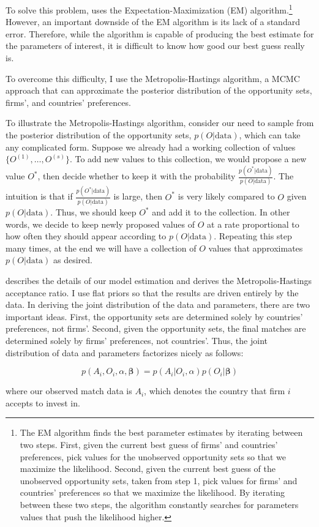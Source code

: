 To solve this problem, \cite{Logan1996} uses the Expectation-Maximization (EM) algorithm.\footnote{The EM algorithm finds the best parameter estimates by iterating between two steps. First, given the current best guess of firms' and countries' preferences, pick values for the unobserved opportunity sets so that we maximize the likelihood. Second, given the current best guess of the unobserved opportunity sets, taken from step 1, pick values for firms' and countries' preferences so that we maximize the likelihood. By iterating between these two steps, the algorithm constantly searches for parameters values that push the likelihood higher.} However, an important downside of the EM algorithm is its lack of a standard error. Therefore, while the algorithm is capable of producing the best estimate for the parameters of interest, it is difficult to know how good our best guess really is.

To overcome this difficulty, I use the Metropolis-Hastings algorithm, a MCMC approach that can approximate the posterior distribution of the opportunity sets, firms', and countries' preferences.

To illustrate the Metropolis-Hastings algorithm, consider our need to sample from the posterior distribution of the opportunity sets, $p(O|\text{data})$, which can take any complicated form. Suppose we already had a working collection of values $\{O^{(1)}, \dots, O^{(s)}\}$. To add new values to this collection, we would propose a new value $O^*$, then decide whether to keep it with the probability $\frac{p(O^*|\text{data})}{p(O|\text{data})}$. The intuition is that if $\frac{p(O^*|\text{data})}{p(O|\text{data})}$ is large, then $O^*$ is very likely compared to $O$ given $p(O|\text{data})$. Thus, we should keep $O^*$ and add it to the collection. In other words, we decide to keep newly proposed values of $O$ at a rate proportional to how often they should appear according to $p(O|\text{data})$. Repeating this step many times, at the end we will have a collection of $O$ values that approximates $p(O|\text{data})$ as desired.

 describes the details of our model estimation and derives the Metropolis-Hastings acceptance ratio. I use flat priors so that the results are driven entirely by the data. In deriving the joint distribution of the data and parameters, there are two important ideas. First, the opportunity sets are determined solely by countries' preferences, not firms'. Second, given the opportunity sets, the final matches are determined solely by firms' preferences, not countries'. Thus, the joint distribution of data and parameters factorizes nicely as follows:

\[
p(A_i, O_i, \alpha, \bm{\beta}) = p(A_i|O_i, \alpha) p(O_i | \bm{\beta})
\]

where our observed match data is $A_i$, which denotes the country that firm $i$ accepts to invest in.
